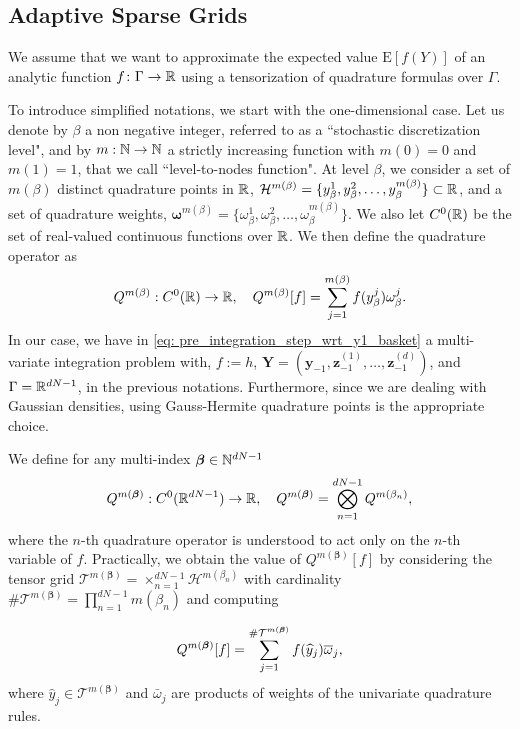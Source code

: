 \subsection{Adaptive Sparse Grids}\label{sec:Details of the ASGQ}

We assume that we want to approximate the expected value $\text{E}[f(Y)]$ of an analytic function $f\colon \Gamma \to \mathbb{R}$ using a tensorization of quadrature formulas over $\Gamma$.

To introduce simplified notations, we start with the one-dimensional case. Let us denote by $\beta$ a non negative integer, referred to as a ``stochastic discretization level", and by $m: \mathbb{N} \rightarrow \mathbb{N}$  a strictly increasing function with $m(0)=0$ and $m(1)=1$, that we call  ``level-to-nodes function". At level $\beta$, we consider a set of $m(\beta)$ distinct quadrature points in $\mathbb{R}$, $\mathcal{H}^{m(\beta)}=\{y^1_\beta,y^2_\beta,\dots,y_\beta^{m(\beta)}\} \subset \mathbb{R}$, and a set of quadrature weights, $\boldsymbol{\omega}^{m(\beta)}=\{\omega^1_\beta,\omega^2_\beta,\dots,\omega_\beta^{m(\beta)}\}$. We also let $C^0(\mathbb{R})$ be the set of real-valued continuous functions over $\mathbb{R}$. We then define the quadrature operator as
\begin{equation*}
Q^{m(\beta)}:C^0(\mathbb{R}) \rightarrow \mathbb{R}, \quad Q^{m(\beta)}[f]= \sum_{j=1}^{m(\beta)} f(y^j_\beta) \omega_\beta^j.
\end{equation*}
In our case, we have in \eqref{eq: pre_integration_step_wrt_y1_basket} a multi-variate integration problem with, $f:=h$, $\mathbf{Y}=(\mathbf{y}_{-1},\mathbf{z}^{(1)}_{-1},\dots,\mathbf{z}^{(d)}_{-1})$,  and  $\Gamma=\mathbb{R}^{dN-1}$, in the previous notations.  Furthermore, since we are dealing with Gaussian densities, using Gauss-Hermite quadrature points is the appropriate choice.

We define for any multi-index $\boldsymbol{\beta} \in \mathbb{N}^{dN-1}$
$$Q^{m(\boldsymbol{\beta})}: C^0(\mathbb{R}^{dN-1}) \rightarrow \mathbb{R},\quad  Q^{m(\boldsymbol{\beta})}= \bigotimes_{n = 1}^{dN-1} Q^{m(\beta_n)} , $$
where the $n$-th quadrature operator is understood to act only on the $n$-th variable of $f$. Practically, we obtain the value of $Q^{m(\boldsymbol{\beta})}[f]$  by considering the tensor grid $\mathcal{T}^{m(\boldsymbol{\beta})}= \times_{n = 1}^{dN-1}  \mathcal{H}^{m(\beta_n)}$ with cardinality $\#\mathcal{T}^{m(\boldsymbol{\beta})}=\prod_{n=1}^{dN-1} m (\beta_n)$ and computing

$$ Q^{m(\boldsymbol{\beta})}[f]= \sum_{j=1}^{\#\mathcal{T}^{m(\boldsymbol{\beta})}} f(\widehat{y}_j) \overline{\omega}_j ,$$
where $\hat{y}_j \in \mathcal{T}^{m(\boldsymbol{\beta})}$ and $\bar{\omega}_j$ are  products of weights of the univariate quadrature rules.

